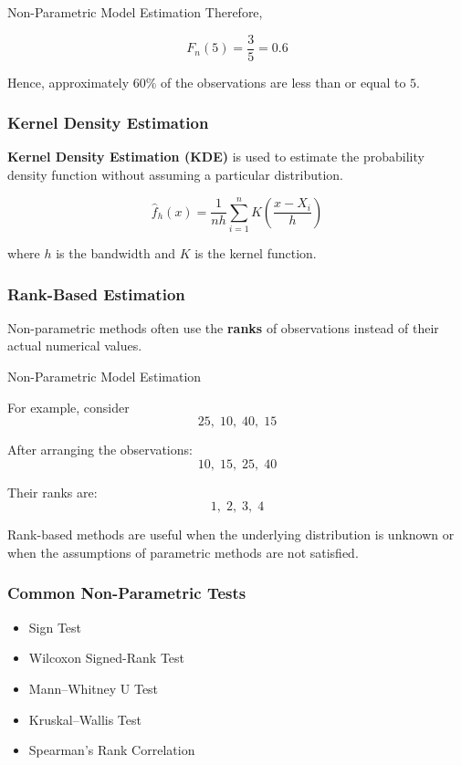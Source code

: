 \documentclass[aspectratio=169]{beamer}
\begin{document}
\begin{frame}{Non-Parametric Model Estimation}
Therefore,

\[
F_n(5)=\frac{3}{5}=0.6
\]

Hence, approximately $60\%$ of the observations are less than or
equal to $5$.

\vspace{0.3cm}

\subsubsection*{Kernel Density Estimation}

\textbf{Kernel Density Estimation (KDE)} is used to estimate the
probability density function without assuming a particular distribution.

\[
\boxed{
\hat{f}_h(x)
=
\frac{1}{nh}
\sum_{i=1}^{n}
K\left(\frac{x-X_i}{h}\right)
}
\]

where $h$ is the bandwidth and $K$ is the kernel function.


\subsubsection*{Rank-Based Estimation}

Non-parametric methods often use the \textbf{ranks} of observations
instead of their actual numerical values.
\end{frame}


\begin{frame}{Non-Parametric Model Estimation}

For example, consider
\vspace{0.0 cm}
\[
25,\;10,\;40,\;15
\]

After arranging the observations:
\vspace{0.0 cm}
\[
10,\;15,\;25,\;40
\]

Their ranks are:
\vspace{0.0 cm}
\[
1,\;2,\;3,\;4
\]

Rank-based methods are useful when the underlying distribution is
unknown or when the assumptions of parametric methods are not satisfied.

\subsubsection*{Common Non-Parametric Tests}

\begin{itemize}
    \item Sign Test
    \item Wilcoxon Signed-Rank Test
    \item Mann--Whitney U Test
    \item Kruskal--Wallis Test
    \item Spearman's Rank Correlation
\end{itemize}

\end{frame}
\end{document}
